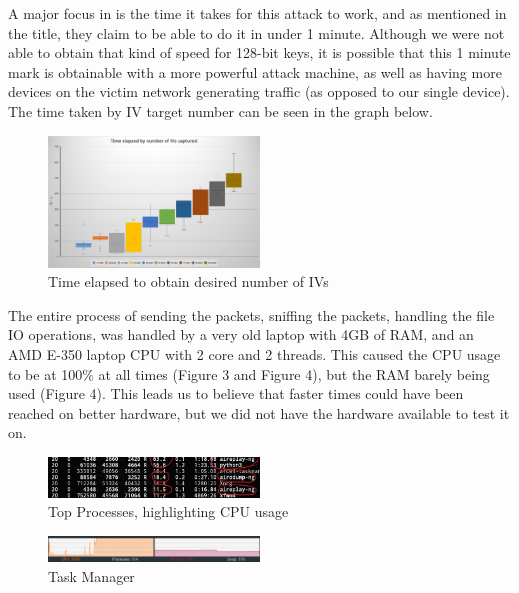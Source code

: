 \documentclass[10pt, titlepage]{article}
\begin{document}
A major focus in \cite{mainPaper} is the time it takes for this attack to work, and as mentioned in the title, they claim to be able to do it in under 1 minute. Although we were not able to obtain that kind of speed for 128-bit keys, it is possible that this 1 minute mark is obtainable with a more powerful attack machine, as well as having more devices on the victim network generating traffic (as opposed to our single device). The time taken by IV target number can be seen in the graph below.

\begin{figure}[H]
 	\centering
    \includegraphics[width=0.5\textwidth]{./images/unknown-3.png}
    \caption{Time elapsed to obtain desired number of IVs}
\end{figure}

The entire process of sending the packets, sniffing the packets, handling the file IO operations, was handled by a very old laptop with 4GB of RAM, and an AMD E-350 laptop CPU with 2 core and 2 threads. This caused the CPU usage to be at 100\% at all times (Figure 3 and Figure 4), but the RAM barely being used (Figure 4). This leads us to believe that faster times could have been reached on better hardware, but we did not have the hardware available to test it on. \\

\begin{figure}[H]
 	\centering
    \includegraphics[width=0.5\textwidth]{./images/top_procs.jpg}
    \caption{Top Processes, highlighting CPU usage}
\end{figure}

\begin{figure}[H]
 	\centering
    \includegraphics[width=0.5\textwidth]{./images/task_manager_process_view.png}
    \caption{Task Manager}
\end{figure}
\end{document}
